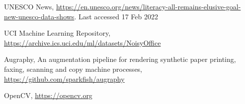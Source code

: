 \documentclass[runningheads]{llncs}
\begin{document}


\begin{thebibliography}{8}

  UNESCO News, \url{https://en.unesco.org/news/literacy-all-remains-elusive-goal-new-unesco-data-shows}. Last accessed 17 Feb 2022

  UCI Machine Learning Repository, \url{https://archive.ics.uci.edu/ml/datasets/NoisyOffice}

  Augraphy, An augmentation pipeline for rendering synthetic paper printing, faxing, scanning and copy machine processes, \url{https://github.com/sparkfish/augraphy}

  OpenCV, \url{https://opencv.org}



\end{thebibliography}
\end{document}
